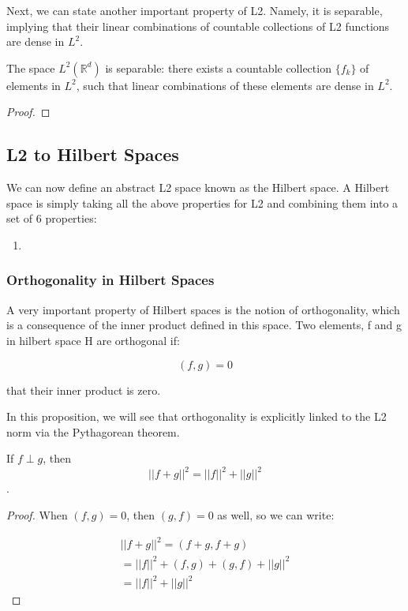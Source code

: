 \documentclass[class=article, crop=false]{standalone}
\begin{document}
		Next, we can state another important property of L2. Namely, it is separable, implying that their linear combinations of countable collections of L2 functions are dense in $L^2$.

		\begin{theorem} 
			The space $L^2(\mathbb{R}^d)$ is separable: there exists a countable collection $\{f_k\}$ of elements in $L^2$, such that linear combinations of these elements are dense in $L^2$.
		\end{theorem}
		\begin{proof}
		\end{proof}

	\subsection{L2 to Hilbert Spaces}
		We can now define an abstract L2 space known as the Hilbert space. A Hilbert space is simply taking all the above properties for L2 and combining them into a set of 6 properties:

		\begin{enumerate}
			\item
		\end{enumerate}

		\subsubsection{Orthogonality in Hilbert Spaces}
			A very important property of Hilbert spaces is the notion of orthogonality, which is a consequence of the inner product defined in this space. Two elements, f and g in hilbert space H are orthogonal if:

				$$(f, g) = 0$$

			that their inner product is zero.

			In this proposition, we will see that orthogonality is explicitly linked to the L2 norm via the Pythagorean theorem.

			\begin{proposition} 
				If $f \perp g$, then $$||f + g||^2 = ||f||^2 + ||g||^2$$.
			\end{proposition}
			\begin{proof}
				When $(f, g) = 0$, then $(g, f) = 0$ as well, so we can write:

				\begin{align}
					||f + g||^2 = (f+g, f+g) \\
						= ||f||^2 + (f,g) + (g,f) + ||g||^2 \\
						= ||f||^2 + ||g||^2
				\end{align}
			\end{proof}
\end{document}
